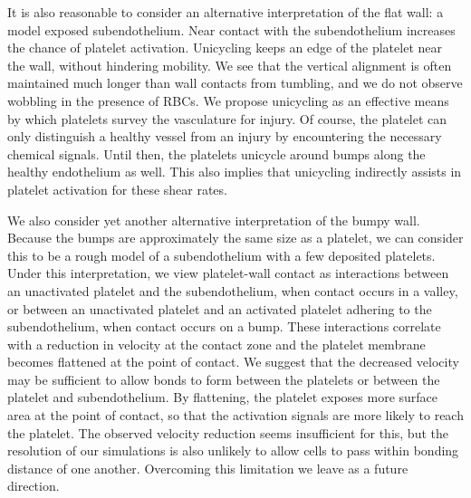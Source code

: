 It is also reasonable to consider an alternative interpretation of the flat wall: a model exposed subendothelium.
Near contact with the subendothelium increases the chance of platelet activation.  Unicycling keeps an edge of the
platelet near the wall, without hindering mobility. We see that the vertical alignment is often maintained much
longer than wall contacts from tumbling, and we do not observe wobbling in the presence of RBCs.  We propose
unicycling as an effective means by which platelets survey the vasculature for injury. Of course, the platelet can
only distinguish a healthy vessel from an injury by encountering the necessary chemical signals. Until then, the
platelets unicycle around bumps along the healthy endothelium as well. This also implies that unicycling
indirectly assists in platelet activation for these shear rates.

We also consider yet another alternative interpretation of the bumpy wall. Because the bumps are approximately the
same size as a platelet, we can consider this to be a rough model of a subendothelium with a few deposited
platelets. Under this interpretation, we view platelet-wall contact as interactions between an unactivated
platelet and the subendothelium, when contact occurs in a valley, or between an unactivated platelet and an
activated platelet adhering to the subendothelium, when contact occurs on a bump.  These interactions correlate
with a reduction in velocity at the contact zone and the platelet membrane becomes flattened at the point of
contact. We suggest that the decreased velocity may be sufficient to allow bonds to form between the platelets or
between the platelet and subendothelium. By flattening, the platelet exposes more surface area at the point of
contact, so that the activation signals are more likely to reach the platelet. The observed velocity reduction
seems insufficient for this, but the resolution of our simulations is also unlikely to allow cells to pass within
bonding distance of one another. Overcoming this limitation we leave as a future direction.
